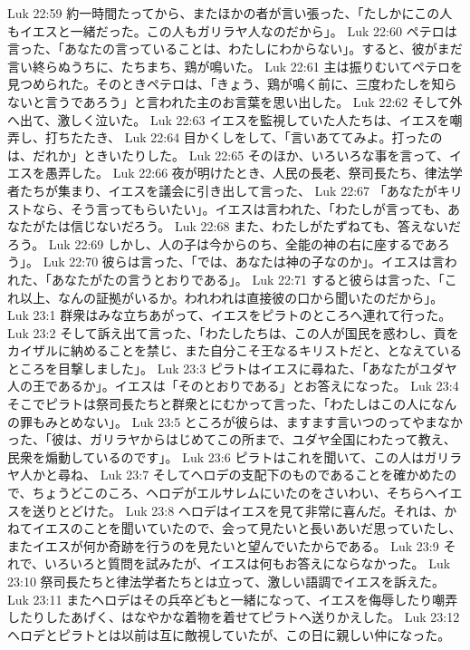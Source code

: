 Luk 22:59  約一時間たってから、またほかの者が言い張った、「たしかにこの人もイエスと一緒だった。この人もガリラヤ人なのだから」。
Luk 22:60  ペテロは言った、「あなたの言っていることは、わたしにわからない」。すると、彼がまだ言い終らぬうちに、たちまち、鶏が鳴いた。
Luk 22:61  主は振りむいてペテロを見つめられた。そのときペテロは、「きょう、鶏が鳴く前に、三度わたしを知らないと言うであろう」と言われた主のお言葉を思い出した。
Luk 22:62  そして外へ出て、激しく泣いた。
Luk 22:63  イエスを監視していた人たちは、イエスを嘲弄し、打ちたたき、
Luk 22:64  目かくしをして、「言いあててみよ。打ったのは、だれか」ときいたりした。
Luk 22:65  そのほか、いろいろな事を言って、イエスを愚弄した。
Luk 22:66  夜が明けたとき、人民の長老、祭司長たち、律法学者たちが集まり、イエスを議会に引き出して言った、
Luk 22:67  「あなたがキリストなら、そう言ってもらいたい」。イエスは言われた、「わたしが言っても、あなたがたは信じないだろう。
Luk 22:68  また、わたしがたずねても、答えないだろう。
Luk 22:69  しかし、人の子は今からのち、全能の神の右に座するであろう」。
Luk 22:70  彼らは言った、「では、あなたは神の子なのか」。イエスは言われた、「あなたがたの言うとおりである」。
Luk 22:71  すると彼らは言った、「これ以上、なんの証拠がいるか。われわれは直接彼の口から聞いたのだから」。
Luk 23:1  群衆はみな立ちあがって、イエスをピラトのところへ連れて行った。
Luk 23:2  そして訴え出て言った、「わたしたちは、この人が国民を惑わし、貢をカイザルに納めることを禁じ、また自分こそ王なるキリストだと、となえているところを目撃しました」。
Luk 23:3  ピラトはイエスに尋ねた、「あなたがユダヤ人の王であるか」。イエスは「そのとおりである」とお答えになった。
Luk 23:4  そこでピラトは祭司長たちと群衆とにむかって言った、「わたしはこの人になんの罪もみとめない」。
Luk 23:5  ところが彼らは、ますます言いつのってやまなかった、「彼は、ガリラヤからはじめてこの所まで、ユダヤ全国にわたって教え、民衆を煽動しているのです」。
Luk 23:6  ピラトはこれを聞いて、この人はガリラヤ人かと尋ね、
Luk 23:7  そしてヘロデの支配下のものであることを確かめたので、ちょうどこのころ、ヘロデがエルサレムにいたのをさいわい、そちらへイエスを送りとどけた。
Luk 23:8  ヘロデはイエスを見て非常に喜んだ。それは、かねてイエスのことを聞いていたので、会って見たいと長いあいだ思っていたし、またイエスが何か奇跡を行うのを見たいと望んでいたからである。
Luk 23:9  それで、いろいろと質問を試みたが、イエスは何もお答えにならなかった。
Luk 23:10  祭司長たちと律法学者たちとは立って、激しい語調でイエスを訴えた。
Luk 23:11  またヘロデはその兵卒どもと一緒になって、イエスを侮辱したり嘲弄したりしたあげく、はなやかな着物を着せてピラトへ送りかえした。
Luk 23:12  ヘロデとピラトとは以前は互に敵視していたが、この日に親しい仲になった。
